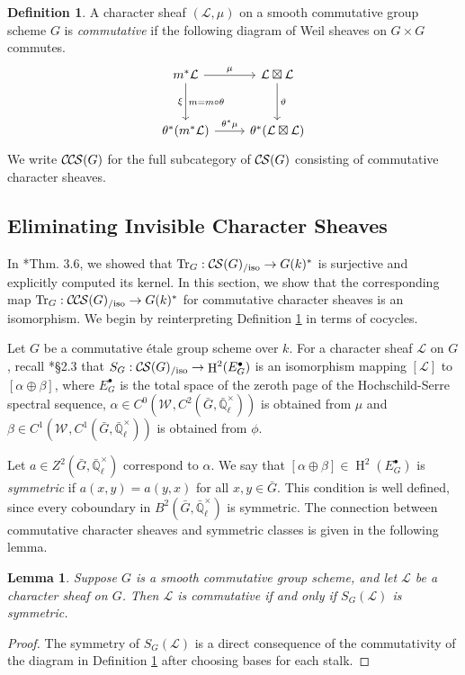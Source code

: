 \documentclass[10pt]{amsart}
\theoremstyle{plain}
\newtheorem{lemma}[theorem]{Lemma}
\theoremstyle{definition}
\newtheorem{definition}[theorem]{Definition}
\newcommand{\EE}{\mathbb{\bar Q}_\ell}
\newcommand{\EEx}{\EE^\times}
\newcommand{\Weil}[1]{\mathcal{W}_{#1}}
\DeclareMathOperator{\Hh}{H}
\newcommand{\TrFrob}[1]{\operatorname{Tr}_{#1}}
\newcommand{\cs}[1]{{\mathcal{#1}}}
\newcommand{\CS}{{\mathcal{C\hskip-0.8pt S}}}
\newcommand{\CCS}{{\mathcal{C\hskip-.8pt C\hskip-0.8pt S}}}
\newcommand{\CSiso}[1]{\CS(#1)_{/\text{iso}}}
\newcommand{\CCSiso}[1]{\CCS(#1)_{/\text{iso}}}
\newcommand{\bG}{\bar{G}}
\begin{document}
\begin{definition}\label{def:CCScom}
A character sheaf $(\cs{L}, \mu)$ on a smooth commutative group scheme $G$ is \emph{commutative}
if the following diagram of Weil sheaves on $G \times G$ commutes.
  \[
  \begin{tikzcd}[row sep=30]
   m^*\cs{L} \arrow{d}[swap]{\xi}{m= m\circ\theta} \arrow{r}{\mu} & \cs{L}\boxtimes\cs{L} \arrow{d}{\vartheta}\\
   \theta^*(m^*\cs{L}) \arrow{r}{{\theta}^*\mu} &  \theta^*(\cs{L}\boxtimes\cs{L})
  \end{tikzcd}
  \]
We write $\CCS(G)$ for the full subcategory of $\CS(G)$ consisting of commutative character sheaves.
 \end{definition}

\subsection{Eliminating Invisible Character Sheaves}\label{ssec:defect}

In \cite{cunningham-roe:13a}*{Thm. 3.6}, we showed that $\TrFrob{G} : \CSiso{G} \to G(k)^*$ is surjective and
explicitly computed its kernel.  In this section, we show that the corresponding map
$\TrFrob{G} : \CCSiso{G} \to G(k)^*$ for commutative character sheaves is an isomorphism.
We begin by reinterpreting Definition \ref{def:CCScom} in terms of cocycles.

Let $G$ be a commutative \'etale group scheme over $k$. For a character sheaf $\cs{L}$ on $G$, recall
\cite{cunningham-roe:13a}*{\S 2.3} that $S_G : \CSiso{G} \to \Hh^2(E_G^\bullet)$ is an isomorphism mapping
$[\cs{L}]$ to $[\alpha \oplus \beta]$, where $E_G^\bullet$ is the total space of the zeroth page
of the Hochschild-Serre spectral sequence, $\alpha \in C^0(\Weil{}, C^2(\bG, \EEx))$ is obtained from $\mu$ and
$\beta \in C^1(\Weil{}, C^1(\bG, \EEx))$ is obtained from $\phi$.

Let $a \in Z^2(\bG, \EEx)$ correspond to $\alpha$.  We say that $[\alpha \oplus \beta] \in \Hh^2(E_G^\bullet)$
is \emph{symmetric} if $a(x,y) = a(y,x)$ for all $x,y \in \bG$.  This condition is well defined, since every
coboundary in $B^2(\bG, \EEx)$ is symmetric.  The connection between commutative character sheaves
and symmetric classes is given in the following lemma.

\begin{lemma} \label{lem:symccslink}
Suppose $G$ is a smooth commutative group scheme, and let $\cs{L}$ be a character sheaf on $G$.
Then $\cs{L}$ is commutative if and only if $S_G(\cs{L})$ is symmetric.
\end{lemma}
\begin{proof}
The symmetry of $S_G(\cs{L})$ is a direct consequence of the commutativity of the diagram in Definition \ref{def:CCScom}
after choosing bases for each stalk.
\end{proof}
\end{document}
